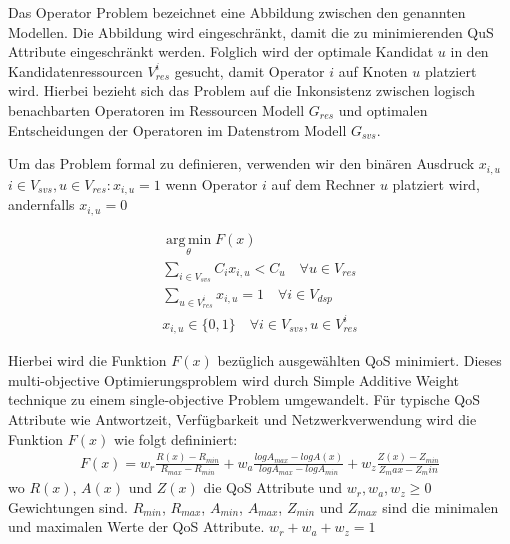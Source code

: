 \documentclass{article}
\begin{document}
Das Operator Problem bezeichnet eine Abbildung zwischen den genannten Modellen. Die Abbildung wird eingeschränkt,
damit die zu minimierenden QuS Attribute eingeschränkt werden. Folglich wird der optimale Kandidat $u$ in den Kandidatenressourcen $V_{res}^i$
gesucht, damit Operator $i$ auf Knoten $u$ platziert wird.
Hierbei bezieht sich das Problem auf die Inkonsistenz zwischen 
logisch benachbarten Operatoren im Ressourcen Modell $G_{res}$ und optimalen Entscheidungen der Operatoren im Datenstrom Modell $G_{svs}$.

Um das Problem formal zu definieren, verwenden wir den binären Ausdruck $x_{i,u}$ $i \in V_{svs}, u \in V_{res}: x_{i,u} = 1$ wenn Operator $i$
auf dem Rechner $u$ platziert wird, andernfalls $x_{i,u} = 0$

\[ 
    \begin{gathered}
        \operatorname*{arg\,min}_\theta F(x) \\
        \sum_{i \in V_{svs}} C_i x_{i,u} < C_u \quad \forall u \in V_{res} \\ %
        \sum_{u \in V_{res}^i} x_{i,u} = 1 \quad \forall i \in V_{dsp} \\ %
        x_{i,u} \in \{0,1\} \quad \forall i \in V_{svs}, u \in V_{res}^i
    \end{gathered}
\] 

Hierbei wird die Funktion $F(x)$ bezüglich ausgewählten QoS minimiert. Dieses multi-objective Optimierungsproblem wird durch 
Simple Additive Weight technique \cite{yoon-multiple-optimization} zu einem single-objective Problem umgewandelt.
Für typische QoS Attribute wie Antwortzeit, Verfügbarkeit und Netzwerkverwendung \cite{efficient-operator-placement} wird die Funktion $F(x)$ wie folgt defininiert:
\[ 
    \begin{gathered}
        F(x) = w_r \frac{R(x) - R_{min}}{R_{max} - R_{min}} 
        + w_a \frac{log A_{max} - log A(x)}{log A_{max} - log A_{min}} 
        + w_z \frac{Z(x) - Z_{min}}{Z_max - Z_min} 
    \end{gathered}  \label{to-miminize-function}
\] 
wo $R(x)$, $A(x)$ und $Z(x)$ die QoS Attribute und $w_r, w_a, w_z \geq 0$ Gewichtungen sind. $R_{min}$, $R_{max}$, $A_{min}$, $A_{max}$, $Z_{min}$ und $Z_{max}$ sind die minimalen und maximalen Werte der QoS Attribute.
$w_r + w_a + w_z = 1$


\end{document}
